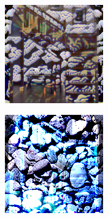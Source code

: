 \begin{figure}[]
\begin{subfigure}{\textwidth}
\begin{subfigure}{0.19\textwidth}
            \caption*{}
        \end{subfigure}
        \hfill
        \begin{subfigure}{0.19\textwidth}
            \centering
            \includegraphics[width=\textwidth]{images/04-experiment03/staircase_illum/pebbles/stats_proj.jpg}
            \caption*{}
        \end{subfigure}
        \hfill
        \begin{subfigure}{0.19\textwidth}
            \centering
            \includegraphics[width=\textwidth]{images/04-experiment03/staircase_illum/pebbles/pixel_im.jpg}

\end{subfigure}
\end{subfigure}
\end{figure}
